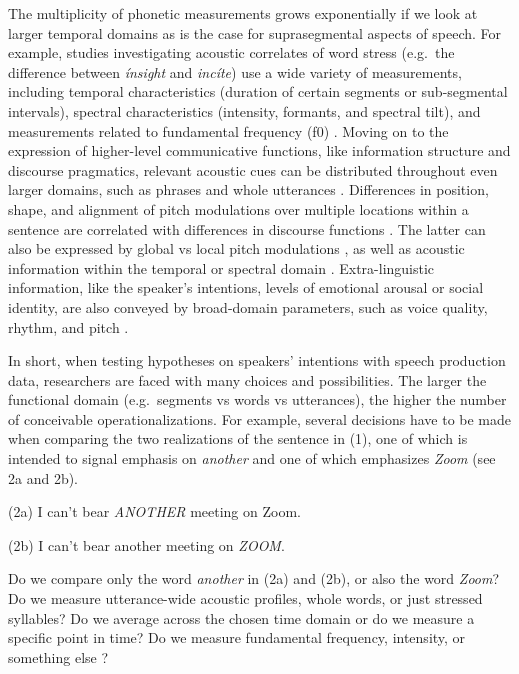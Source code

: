 \documentclass[Review,times,sageh]{sagej}
\begin{document}
The multiplicity of phonetic measurements grows exponentially if we look at larger temporal domains as is the case for suprasegmental aspects of speech.
For example, studies investigating acoustic correlates of word stress (e.g.~the difference between \emph{ínsight} and \emph{incíte}) use a wide variety of measurements, including temporal characteristics (duration of certain segments or sub-segmental intervals), spectral characteristics (intensity, formants, and spectral tilt), and measurements related to fundamental frequency (f0) \citep[e.g.,][]{gordon2017acoustic}.
Moving on to the expression of higher-level communicative functions, like information structure and discourse pragmatics, relevant acoustic cues can be distributed throughout even larger domains, such as phrases and whole utterances \citep[e.g.,][]{ladd2008intonational}.
Differences in position, shape, and alignment of pitch modulations over multiple locations within a sentence are correlated with differences in discourse functions \citep[e.g.,][]{niebuhr2011}.
The latter can also be expressed by global vs local pitch modulations \citep{heuven2002}, as well as acoustic information within the temporal or spectral domain \citep[e.g.,][]{van2005speech}.
Extra-linguistic information, like the speaker's intentions, levels of emotional arousal or social identity, are also conveyed by broad-domain parameters, such as voice quality, rhythm, and pitch \citep{foulkes2006, ogden2004, white2009}.

In short, when testing hypotheses on speakers' intentions with speech production data, researchers are faced with many choices and possibilities.
The larger the functional domain (e.g.~segments vs words vs utterances), the higher the number of conceivable operationalizations.
For example, several decisions have to be made when comparing the two realizations of the sentence in (1), one of which is intended to signal emphasis on \emph{another} and one of which emphasizes \emph{Zoom} (see 2a and 2b).

\vspace{1em}

(2a) I can't bear \emph{ANOTHER} meeting on Zoom.

(2b) I can't bear another meeting on \emph{ZOOM}.

\vspace{1em}

Do we compare only the word \emph{another} in (2a) and (2b), or also the word \emph{Zoom}?
Do we measure utterance-wide acoustic profiles, whole words, or just stressed syllables?
Do we average across the chosen time domain or do we measure a specific point in time?
Do we measure fundamental frequency, intensity, or something else \citep{stevens2000}?
\end{document}
